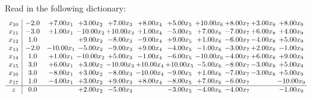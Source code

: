 \documentclass[9pt]{article}
\begin{document}
Read in the following dictionary:
\[\begin{array}{c| c c@{\hskip 2pt} c@{\hskip 2pt} c@{\hskip 2pt} c@{\hskip 2pt} c@{\hskip 2pt} c@{\hskip 2pt} c@{\hskip 2pt} c@{\hskip 2pt} c@{\hskip 2pt} }
 x_{10}   &  -2.0 & +  7.00 x_{1} & +  3.00 x_{2} & +  7.00 x_{3} & +  8.00 x_{4} & +  5.00 x_{5} & + 10.00 x_{6} & +  8.00 x_{7} & +  3.00 x_{8} & +  8.00 x_{9}\\
 x_{11}   &  -3.0 & +  1.00 x_{1} & -10.00 x_{2} & + 10.00 x_{3} & +  1.00 x_{4} & -5.00 x_{5} & +  7.00 x_{6} & -7.00 x_{7} & +  6.00 x_{8} & +  4.00 x_{9}\\
 x_{12}   &  1.0  &   & +  9.00 x_{2} & -8.00 x_{3} & -9.00 x_{4} & +  9.00 x_{5} & +  1.00 x_{6} & -6.00 x_{7} & -4.00 x_{8} & +  5.00 x_{9}\\
 x_{13}   &  -2.0 & -10.00 x_{1} & -5.00 x_{2} & -9.00 x_{3} & +  9.00 x_{4} & -4.00 x_{5} & -1.00 x_{6} & -3.00 x_{7} & +  2.00 x_{8} & -1.00 x_{9}\\
 x_{14}   &  1.0 & +  1.00 x_{1} & -10.00 x_{2} & +  5.00 x_{3} & -1.00 x_{4} & -6.00 x_{5} & -10.00 x_{6} & -4.00 x_{7} & +  6.00 x_{8} & +  9.00 x_{9}\\
 x_{15}   &  3.0 & +  6.00 x_{1} & +  3.00 x_{2} & -10.00 x_{3} & + 10.00 x_{4} & + 10.00 x_{5} & -5.00 x_{6} & -8.00 x_{7} & -3.00 x_{8} & +  5.00 x_{9}\\
 x_{16}   &  3.0 & -8.00 x_{1} & +  3.00 x_{2} & -8.00 x_{3} & -10.00 x_{4} & -9.00 x_{5} & +  1.00 x_{6} & -7.00 x_{7} & -3.00 x_{8} & +  5.00 x_{9}\\
 x_{17}   &  1.0 & -4.00 x_{1} & +  3.00 x_{2} & +  9.00 x_{3} & +  8.00 x_{4} & -8.00 x_{5} & +  7.00 x_{6} & -6.00 x_{7} &   & -10.00 x_{9}\\
\hline
z    &  0.0  &   & +  2.00 x_{2} & -5.00 x_{3} &   & -3.00 x_{5} & -4.00 x_{6} & -4.00 x_{7} &   & -1.00 x_{9}\\
\end{array}\]
\end{document}
